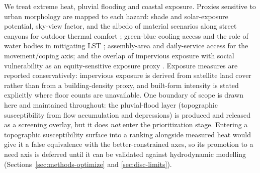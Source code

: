 \label{sec:methods-proxies}
We treat extreme heat, pluvial flooding and coastal exposure. Proxies sensitive
to urban morphology are mapped to each hazard: shade and solar-exposure
potential, sky-view factor, and the albedo of material scenarios along street
canyons for outdoor thermal comfort \citep{middel2018ViewFactor, mohammad2021EvaluatiRole};
green-blue cooling access and the role of water bodies in mitigating LST
\citep{wei2025NatureBased, cai2018WaterBodies, yu2020CriticalReview}; assembly-area
and daily-service access for the movement/coping axis; and the overlap of
impervious exposure with social vulnerability as an equity-sensitive exposure
proxy \citep{turner2025Guhvi, neumann2026ClimateJustice}. Exposure measures are
reported conservatively: impervious exposure is derived from satellite land cover rather
than from a building-density proxy, and built-form intensity is stated explicitly
where floor counts are unavailable. One boundary of scope is drawn here and
maintained throughout: the pluvial-flood layer (topographic susceptibility from
flow accumulation and depressions) is produced and released as a screening
overlay, but it does \emph{not} enter the prioritization stage. Entering a
topographic susceptibility surface into a ranking alongside measured heat would
give it a false equivalence with the better-constrained axes, so its promotion
to a need axis is deferred until it can be validated against hydrodynamic
modelling (Sections~\ref{sec:methods-optimize} and \ref{sec:disc-limits}).


